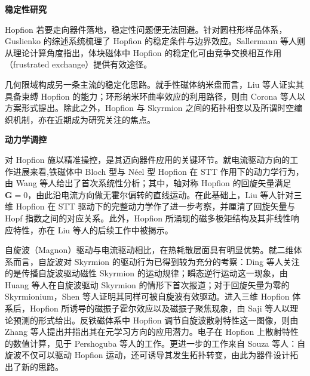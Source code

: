 \par\noindent\textbf{稳定性研究}\par\nobreak

Hopfion 若要走向器件落地，稳定性问题便无法回避。针对圆柱形样品体系，Guslienko 的综述系统梳理了 Hopfion 的稳定条件与边界效应\cite{guslienko2024review}。Sallermann 等人则从理论计算角度指出，体块磁体中 Hopfion 的稳定化可由竞争交换相互作用（frustrated exchange）提供有效途径\cite{sallermann2023stability}。

几何限域构成另一条主流的稳定化思路。就手性磁体纳米盘而言，Liu 等人证实其具备束缚 Hopfion 的能力\cite{liu2018binding}；环形纳米环曲率效应的利用路径，则由 Corona 等人以方案形式提出\cite{corona2023curvature}。除此之外，Hopfion 与 Skyrmion 之间的拓扑相变\cite{gao2024topological,souza2025topological}以及所谓时空编织机制\cite{knapman2024spacetime}，亦在近期成为研究关注的焦点。

\par\noindent\textbf{动力学调控}\par\nobreak

对 Hopfion 施以精准操控，是其迈向器件应用的关键环节。就电流驱动方向的工作进展来看,铁磁体中 Bloch 型与 N\'{e}el 型 Hopfion 在 STT 作用下的动力学行为，由 Wang 等人给出了首次系统性分析\cite{wang2019current}；其中，轴对称 Hopfion 的回旋矢量满足 $\mathbf{G} = 0$，由此沿电流方向做无霍尔偏转的直线运动。在此基础上，Liu 等人针对三维 Hopfion 在 STT 驱动下的完整动力学作了进一步考察，并厘清了回旋矢量与 Hopf 指数之间的对应关系\cite{liu2020three}。此外，Hopfion 所涌现的磁多极矩结构及其非线性响应特性，亦在 Liu 等人的后续工作中被揭示\cite{liu2022emergent}。

自旋波（Magnon）驱动与电流驱动相比，在热耗散层面具有明显优势。就二维体系而言，自旋波对 Skyrmion 的驱动行为已得到较为充分的考察：Ding 等人关注的是传播自旋波驱动磁性 Skyrmion 的运动规律\cite{ding2015motion}；瞬态逆行运动这一现象，由 Huang 等人在自旋波驱动 Skyrmion 的情形下首次报道\cite{huang2023transient}；对于回旋矢量为零的 Skyrmionium，Shen 等人证明其同样可被自旋波有效驱动\cite{shen2018skyrmionium}。进入三维 Hopfion 体系后，Hopfion 所诱导的磁振子霍尔效应以及磁振子聚焦现象，由 Saji 等人以理论预测的形式给出\cite{saji2023magnonic}。反铁磁体系中 Hopfion 调节自旋波散射特性这一图像，则由 Zhang 等人提出并指出其在元学习方向的应用潜力\cite{zhang2023magnon}。电子在 Hopfion 上散射特性的数值计算，见于 Pershoguba 等人的工作\cite{pershoguba2021electronic}。更进一步的工作来自 Souza 等人：自旋波不仅可以驱动 Hopfion 运动，还可诱导其发生拓扑转变\cite{souza2025topological}，由此为器件设计拓出了新的思路。


